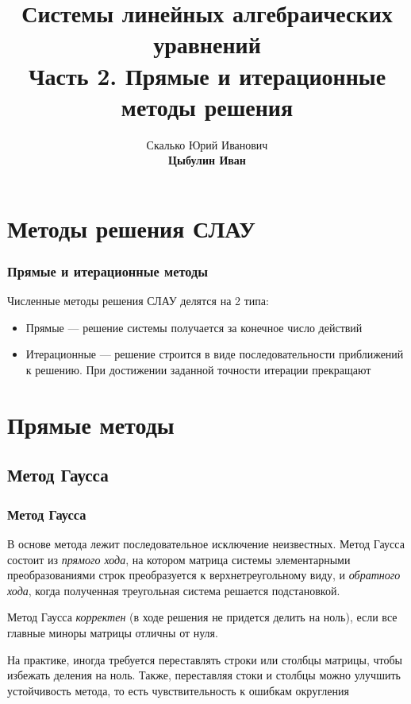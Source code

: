 \documentclass[apectratio=43,unicode]{beamer}
\title[СЛАУ]{Системы линейных алгебраических уравнений\\Часть 2. Прямые и итерационные методы решения}
\author[Цыбулин И.В.]{Скалько Юрий Иванович\\
\textbf{Цыбулин Иван}}
\date{}
\begin{document}
\begin{frame}[plain]
\titlepage
\end{frame}

\section{ }

\def\A{\mathbf{A}}
\def\B{\mathbf{B}}
\def\C{\mathbf{C}}
\def\D{\mathbf{D}}
\def\E{\mathbf{E}}
\def\L{\mathbf{L}}
\def\U{\mathbf{U}}
\def\S{\mathbf{S}}
\def\J{\mathbf{J}}
\def\x{\mathbf{x}}
\def\y{\mathbf{y}}
\def\v{\mathbf{v}}
\def\w{\mathbf{w}}
\def\f{\mathbf{f}}
\def\b{\mathbf{b}}
\def\r{\mathbf{r}}
\def\p{\mathbf{p}}
\def\z{\mathbf{z}}
\newcommand{\tr}{\mathsf{T}}

\section{Методы решения СЛАУ}
\begin{frame}\frametitle{Прямые и итерационные методы}
	Численные методы решения СЛАУ делятся на 2 типа:
	\begin{itemize}
	\item{Прямые} --- решение системы получается за конечное число действий
	\item{Итерационные} --- решение строится в виде последовательности приближений к решению.
	При достижении заданной точности итерации прекращают
	\end{itemize}
\end{frame}

\section{Прямые методы}
\subsection{Метод Гаусса}
\begin{frame}\frametitle{Метод Гаусса}
	В основе метода лежит последовательное исключение неизвестных. Метод Гаусса состоит из
	\emph{прямого хода}, на котором матрица системы элементарными преобразованиями строк преобразуется
	к верхнетреугольному виду, и \emph{обратного хода}, когда полученная треугольная система решается
	подстановкой.

	Метод Гаусса \emph{корректен} (в ходе решения не придется делить на ноль),
	если все главные миноры матрицы отличны от нуля.

	\pause
	На практике, иногда требуется переставлять строки или столбцы матрицы, чтобы избежать деления на ноль.
	Также, переставляя стоки и столбцы можно улучшить устойчивость метода, то есть чувствительность к ошибкам округления
\end{frame}
\end{document}

